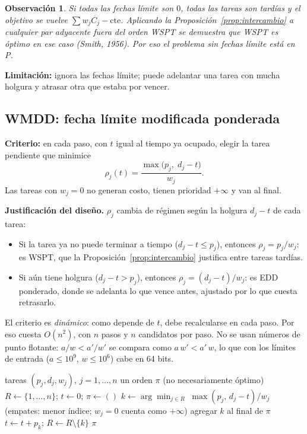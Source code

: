 \documentclass[10pt,twocolumn,letterpaper]{article}
\newtheorem{observacion}{Observación}
\begin{document}
\begin{observacion}
Si todas las fechas límite son $0$, todas las tareas son tardías y el objetivo
se vuelve $\sum w_jC_j-\text{cte}$. Aplicando la
Proposición~\ref{prop:intercambio} a cualquier par adyacente fuera del orden
WSPT se demuestra que WSPT es \emph{óptimo} en ese caso (Smith, 1956). Por eso
el problema sin fechas límite está en P.
\end{observacion}

\textbf{Limitación:} ignora las fechas límite; puede adelantar una tarea con
mucha holgura y atrasar otra que estaba por vencer.

\subsection{WMDD: fecha límite modificada ponderada}

\textbf{Criterio:} en cada paso, con $t$ igual al tiempo ya ocupado, elegir la
tarea pendiente que minimice
\[
\rho_j(t)=\frac{\max\big(p_j,\;d_j-t\big)}{w_j}.
\]
Las tareas con $w_j=0$ no generan costo, tienen prioridad $+\infty$ y van al
final.

\textbf{Justificación del diseño.} $\rho_j$ cambia de régimen según la
holgura $d_j-t$ de cada tarea:
\begin{itemize}
  \item Si la tarea ya no puede terminar a tiempo ($d_j-t\le p_j$), entonces
        $\rho_j=p_j/w_j$: es WSPT, que la Proposición~\ref{prop:intercambio}
        justifica entre tareas tardías.
  \item Si aún tiene holgura ($d_j-t>p_j$), entonces $\rho_j=(d_j-t)/w_j$: es
        EDD ponderado, donde se adelanta lo que vence antes, ajustado por lo
        que cuesta retrasarlo.
\end{itemize}
El criterio es \emph{dinámico}: como depende de $t$, debe recalcularse en cada
paso. Por eso cuesta $O(n^2)$, con $n$ pasos y $n$ candidatos por paso. No se
usan números de punto flotante: $a/w<a'/w'$ se compara como $a\,w'<a'\,w$, lo
que con los límites de entrada ($a\le10^9$, $w\le10^6$) cabe en 64 bits.

\begin{algorithm}[h]
\caption{Voraz WMDD}\label{alg:wmdd}
\begin{algorithmic}[1]
\Require tareas $(p_j,d_j,w_j)$, $j=1,\dots,n$
\Ensure un orden $\pi$ (no necesariamente óptimo)
\State $R\gets\{1,\dots,n\}$;\; $t\gets0$;\; $\pi\gets()$
  \State $k\gets\arg\min_{j\in R}\;\max(p_j,\,d_j-t)/w_j$
  \Statex \hspace{\algorithmicindent}(empates: menor índice; $w_j=0$ cuenta como $+\infty$)
  \State agregar $k$ al final de $\pi$
  \State $t\gets t+p_k$;\; $R\gets R\setminus\{k\}$
\EndWhile
\State \Return $\pi$
\end{algorithmic}
\end{algorithm}
\end{document}
